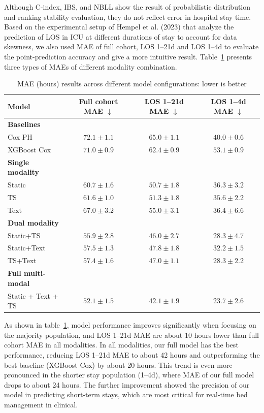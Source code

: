 \documentclass[10pt, a4paper]{article}
\begin{document}
Although C-index, IBS, and NBLL show the result of probabilistic distribution and ranking stability evaluation, they do not reflect error in hospital stay time. Based on the experimental setup of Hempel et al. (2023) \cite{hempel2023prediction} that analyze the prediction of LOS in ICU at different durations of stay to account for data skewness, we also used MAE of full cohort, LOS 1--21d and LOS 1--4d to evaluate the point-prediction accuracy and give a more intuitive result. Table~\ref{tab:mae_results} presents three types of MAEs of different modality combination.

\begin{table}[htbp]
\centering
\caption{MAE (hours) results across different model configurations: lower is better}
\label{tab:mae_results}
\begin{tabular}{lccc}
\toprule
Model & Full cohort MAE $\downarrow$ & LOS 1--21d MAE $\downarrow$ & LOS 1--4d MAE $\downarrow$ \\
\midrule
\textbf{Baselines} & & & \\
Cox PH & $72.1 \pm 1.1$ & $65.0 \pm 1.1$ & $40.0 \pm 0.6$ \\
XGBoost Cox & $71.0 \pm 0.9$ & $62.4 \pm 0.9$ & $53.1 \pm 0.9$ \\
\midrule
\textbf{Single modality} & & & \\
Static & $60.7 \pm 1.6$ & $50.7 \pm 1.8$ & $36.3 \pm 3.2$ \\
TS & $61.6 \pm 1.0$ & $51.3 \pm 1.8$ & $35.6 \pm 2.2$ \\
Text & $67.0 \pm 3.2$ & $55.0 \pm 3.1$ & $36.4 \pm 6.6$ \\
\midrule
\textbf{Dual modality} & & & \\
Static+TS & $55.9 \pm 2.8$ & $46.0 \pm 2.7$ & $28.3 \pm 4.7$ \\
Static+Text & $57.5 \pm 1.3$ & $47.8 \pm 1.8$ & $32.2 \pm 1.5$ \\
TS+Text & $57.4 \pm 1.6$ & $47.0 \pm 1.1$ & $28.3 \pm 2.2$ \\
\midrule
\textbf{Full multi-modal} & & & \\
Static + Text + TS & $\mathbf{52.1 \pm 1.5}$ & $\mathbf{42.1 \pm 1.9}$ & $\mathbf{23.7 \pm 2.6}$ \\
\bottomrule
\end{tabular}
\end{table}

As shown in table~\ref{tab:mae_results}, model performance improves significantly when focusing on the majority population, and LOS 1--21d MAE are about 10 hours lower than full cohort MAE in all modalities. In all modalities, our full model has the best performance, reducing LOS 1--21d MAE to about 42 hours and outperforming the best baseline (XGBoost Cox) by about 20 hours. This trend is even more pronounced in the shorter stay population (1--4d), where MAE of our full model drops to about 24 hours. The further improvement showed the precision of our model in predicting short-term stays, which are most critical for real-time bed management in clinical. 
\end{document}
